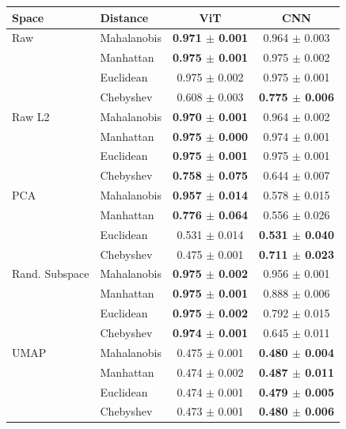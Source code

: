 \begin{tabular}{llcc}
\toprule
Space & Distance & ViT & CNN \\
\midrule
Raw & Mahalanobis & \textbf{0.971 $\pm$ 0.001} & 0.964 $\pm$ 0.003 \\
 & Manhattan & \textbf{0.975 $\pm$ 0.001} & 0.975 $\pm$ 0.002 \\
 & Euclidean & 0.975 $\pm$ 0.002 & 0.975 $\pm$ 0.001 \\
 & Chebyshev & 0.608 $\pm$ 0.003 & \textbf{0.775 $\pm$ 0.006} \\
\midrule
Raw L2 & Mahalanobis & \textbf{0.970 $\pm$ 0.001} & 0.964 $\pm$ 0.002 \\
 & Manhattan & \textbf{0.975 $\pm$ 0.000} & 0.974 $\pm$ 0.001 \\
 & Euclidean & \textbf{0.975 $\pm$ 0.001} & 0.975 $\pm$ 0.001 \\
 & Chebyshev & \textbf{0.758 $\pm$ 0.075} & 0.644 $\pm$ 0.007 \\
\midrule
PCA & Mahalanobis & \textbf{0.957 $\pm$ 0.014} & 0.578 $\pm$ 0.015 \\
 & Manhattan & \textbf{0.776 $\pm$ 0.064} & 0.556 $\pm$ 0.026 \\
 & Euclidean & 0.531 $\pm$ 0.014 & \textbf{0.531 $\pm$ 0.040} \\
 & Chebyshev & 0.475 $\pm$ 0.001 & \textbf{0.711 $\pm$ 0.023} \\
\midrule
Rand. Subspace & Mahalanobis & \textbf{0.975 $\pm$ 0.002} & 0.956 $\pm$ 0.001 \\
 & Manhattan & \textbf{0.975 $\pm$ 0.001} & 0.888 $\pm$ 0.006 \\
 & Euclidean & \textbf{0.975 $\pm$ 0.002} & 0.792 $\pm$ 0.015 \\
 & Chebyshev & \textbf{0.974 $\pm$ 0.001} & 0.645 $\pm$ 0.011 \\
\midrule
UMAP & Mahalanobis & 0.475 $\pm$ 0.001 & \textbf{0.480 $\pm$ 0.004} \\
 & Manhattan & 0.474 $\pm$ 0.002 & \textbf{0.487 $\pm$ 0.011} \\
 & Euclidean & 0.474 $\pm$ 0.001 & \textbf{0.479 $\pm$ 0.005} \\
 & Chebyshev & 0.473 $\pm$ 0.001 & \textbf{0.480 $\pm$ 0.006} \\

\bottomrule
\end{tabular}